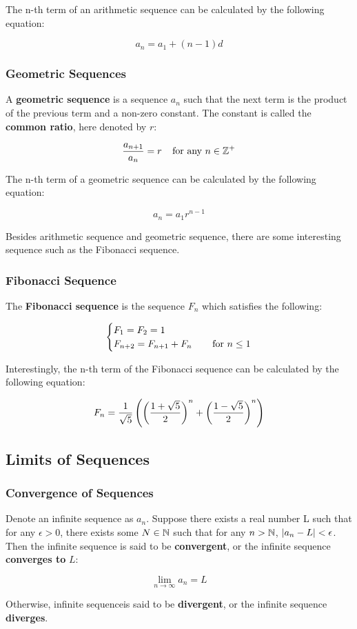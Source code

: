 \documentclass[a4paper,12pt]{article}
\begin{document}
The n-th term of an arithmetic sequence can be calculated by the following equation:

$$a_{n}=a_{1}+(n-1)d$$

\subsubsection{Geometric Sequences}
\begin{dft}
  A \textbf{geometric sequence} is a sequence $a_{n}$ such that the next term is the product of the previous term and a non-zero constant. The constant is called the \textbf{common ratio}, here denoted by $r$:

  $$\frac{a_{n+1}}{a_{n}}=r\;\;\;\;\text{for any }n\in\mathbb{Z}^{+}$$
\end{dft}\n

The n-th term of a geometric sequence can be calculated by the following equation:

$$a_{n}=a_{1}r^{n-1}$$\s

Besides arithmetic sequence and geometric sequence, there are some interesting sequence such as the Fibonacci sequence.

\subsubsection{Fibonacci Sequence}
\begin{dft}
  The \textbf{Fibonacci sequence} is the sequence $F_{n}$ which satisfies the following:

  $$\begin{cases}
    F_{1}=F_{2}=1&\\
    F_{n+2}=F_{n+1}+F_{n}&\;\;\;\;\text{for }n\leq 1
  \end{cases}$$
\end{dft}\n

Interestingly, the n-th term of the Fibonacci sequence can be calculated by the following equation:

$$F_{n}=\frac{1}{\sqrt{5}}\left( \left( \frac{1+\sqrt{5}}{2}\right)^{n}+\left( \frac{1-\sqrt{5}}{2}\right)^{n}\right)$$

\subsection{Limits of Sequences}
\subsubsection{Convergence of Sequences}
\begin{dft}
  Denote an infinite sequence as $a_{n}$. Suppose there exists a real number L such that for any $\epsilon>0$, there exists some $N\in\mathbb{N}$ such that for any $n>\mathbb{N}$, $\left| a_{n}-L\right|<\epsilon$. Then the infinite sequence is said to be \textbf{convergent}, or the infinite sequence \textbf{converges to} $L$:

  $$\lim_{n\to \infty}a_{n}=L$$\s

  Otherwise, infinite sequenceis said to be \textbf{divergent}, or the infinite sequence \textbf{diverges}.
\end{dft}
\end{document}
